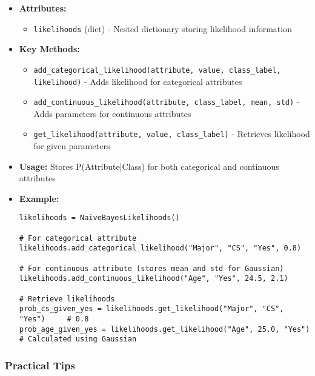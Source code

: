 \documentclass[
english,
smallborders
]{i6prcsht}
\begin{document}
\begin{itemize}
	\item \textbf{Attributes:}
	      \begin{itemize}
		      \item \texttt{likelihoods} (dict) - Nested dictionary storing likelihood information
	      \end{itemize}
	\item \textbf{Key Methods:}
	      \begin{itemize}
		      \item \texttt{add\_categorical\_likelihood(attribute, value, class\_label, likelihood)} - Adds likelihood for categorical attributes
		      \item \texttt{add\_continuous\_likelihood(attribute, class\_label, mean, std)} - Adds parameters for continuous attributes
		      \item \texttt{get\_likelihood(attribute, value, class\_label)} - Retrieves likelihood for given parameters
	      \end{itemize}
	\item \textbf{Usage:} Stores P(Attribute|Class) for both categorical and continuous attributes
	\item \textbf{Example:}
	      \begin{lstlisting}
likelihoods = NaiveBayesLikelihoods()

# For categorical attribute
likelihoods.add_categorical_likelihood("Major", "CS", "Yes", 0.8)

# For continuous attribute (stores mean and std for Gaussian)
likelihoods.add_continuous_likelihood("Age", "Yes", 24.5, 2.1)

# Retrieve likelihoods
prob_cs_given_yes = likelihoods.get_likelihood("Major", "CS", "Yes")     # 0.8
prob_age_given_yes = likelihoods.get_likelihood("Age", 25.0, "Yes")      # Calculated using Gaussian
    \end{lstlisting}
\end{itemize}

\vspace*{0.3cm}

\vspace*{0.5cm}

\subsubsection*{Practical Tips}
\end{document}
